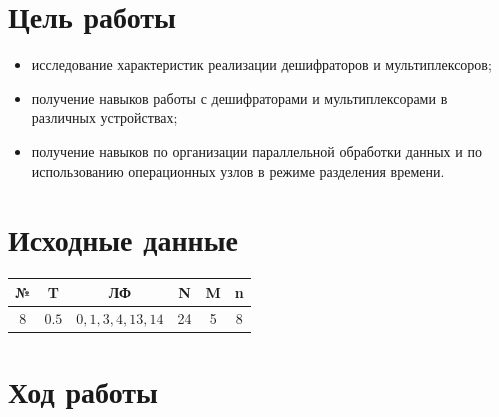 \documentclass[a4paper,12pt]{article}
\begin{document}
    

    
    \tableofcontents

    \section{Цель работы}
    \begin{itemize}
        \item исследование характеристик реализации дешифраторов и мультиплексоров;
        \item получение навыков работы с дешифраторами и мультиплексорами в различных устройствах;
        \item получение навыков по организации параллельной обработки данных и по использованию
        операционных узлов в режиме разделения времени.
    \end{itemize}

    \section{Исходные данные}
    \begin{table}[H]
        \centering
        \begin{tabular}{|c|c|c|c|c|c|}
        \hline
        № & \textbf{T}       & ЛФ              & \textbf{N} & \textbf{M} & \textbf{n} \\ \hline
        8 & $0.5$            & $0,1,3,4,13,14$ & 24         & 5          & 8          \\ \hline
        \end{tabular}
    \end{table}

    \section{Ход работы}
\end{document}
